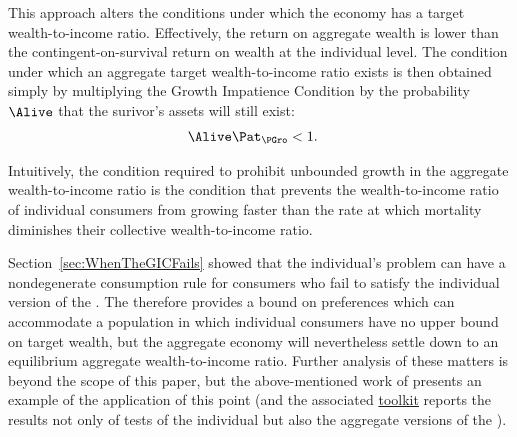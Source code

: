 \documentclass[BufferStockTheory]{subfiles}
\begin{document}
\begin{comment}
  Two natural alternatives present themselves.  The first is to adopt a simplification of Modigliani's approach: For convenience assuming a constant population, if proceeds of the estates of the dying are held in probate (earning interest) until the next period, then distributed uniformly across the population as beginning-of-life bequests $\BLev_{t+1}$, we have 
  \begin{align}
    \BLev^{\text{newborns}}_{t+1} & =  \Rnorm \bar{\ALev}^{\text{decedents}}_{t}                       \label{eq:evenbequestsLev}
  \end{align}
  and if newborns all of permanent income equal to the population mean of 1, the ratio of $\BLev_{t+1}$ to $\PLev_{t+1}=1$ yields
  \begin{align}
    \bRat^{\text{newborns}}_{t+1} & =  \Rnorm \bar{\ALev}^{\text{decedents}}_{t}   \notag                      \label{eq:evenbequestsRat}
  \end{align}
\end{comment}

This approach alters the conditions under which the economy has a target wealth-to-income ratio.  Effectively, the return on aggregate wealth is lower than the contingent-on-survival return on wealth at the individual level. The condition under which an aggregate target wealth-to-income ratio exists is then obtained simply by multiplying the Growth Impatience Condition by the probability $\Alive$ that the surivor's assets will still exist:
\begin{align}
  \Alive  \Pat_{\PGro} & < 1.
\end{align}

Intuitively, the condition required to prohibit unbounded growth in the aggregate wealth-to-income ratio is the condition that prevents the wealth-to-income ratio of individual consumers from growing faster than the rate at which mortality diminishes their collective wealth-to-income ratio.

Section~\ref{sec:WhenTheGICFails} showed that the individual's problem can have a nondegenerate consumption rule for consumers who fail to satisfy the individual version of the {\GIC}.  The {\GICAgg} therefore provides a bound on preferences which can accommodate a population in which individual consumers have no upper bound on target wealth, but the aggregate economy will nevertheless settle down to an equilibrium aggregate wealth-to-income ratio.  Further analysis of these matters is beyond the scope of this paper, but the above-mentioned work of \cite{cstwMPC} presents an example of the application of this point (and the associated \href{https://github.com/econ-ark/HARK}{toolkit} reports the results not only of tests of the individual but also the aggregate versions of the {\GIC}).
\end{document}
